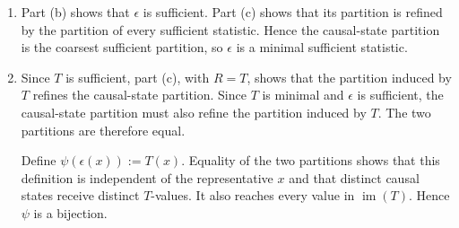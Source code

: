 \begin{solution}[ex:p2-2]
\begin{enumerate}
        Thus any two histories in the same cell induced by $R$ also lie in the
        same causal state. Every cell induced by $R$ is therefore contained in
        a causal state, so the partition induced by $R$ refines the
        causal-state partition. Since $R$ was arbitrary, every sufficient
        partition has this property.

      \item Part (b) shows that $\epsilon$ is sufficient. Part (c) shows that
        its partition is refined by the partition of every sufficient
        statistic. Hence the causal-state partition is the coarsest sufficient
        partition, so $\epsilon$ is a minimal sufficient statistic.

      \item Since $T$ is sufficient, part (c), with $R=T$, shows that the
        partition induced by $T$ refines the causal-state partition. Since
        $T$ is minimal and $\epsilon$ is sufficient, the causal-state
        partition must also refine the partition induced by $T$. The two
        partitions are therefore equal.

        Define $\psi(\epsilon(x)):=T(x)$. Equality of the two partitions shows
        that this definition is independent of the representative $x$ and
        that distinct causal states receive distinct $T$-values. It also
        reaches every value in $\operatorname{im}(T)$. Hence $\psi$ is a
        bijection.
    \end{enumerate}
\end{solution}

